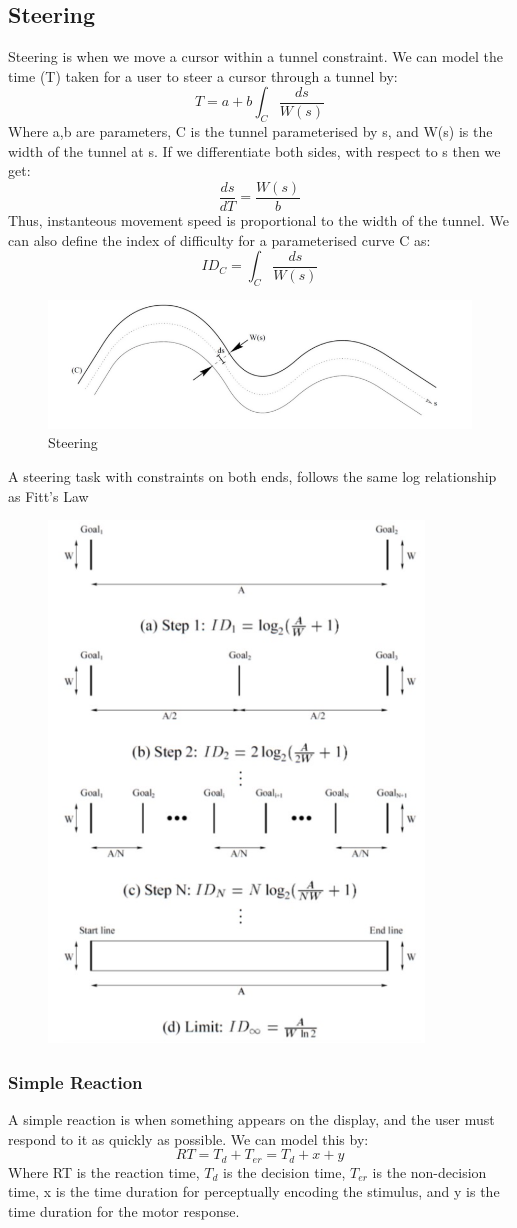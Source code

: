 \documentclass{article}
\begin{document}
\subsection{Steering}
Steering is when we move a cursor within a tunnel constraint. We can model the time (T) taken for a user to steer a cursor through a tunnel by:
\[
T = a + b \int_C \frac{ds}{W(s)}
\]
Where a,b are parameters, C is the tunnel parameterised by s, and W(s) is the width of the tunnel at s. If we differentiate both sides, with respect to s then we get:
\[
\frac{ds}{dT} = \frac{W(s)}{b}
\]
Thus, instanteous movement speed is proportional to the width of the tunnel. We can also define the index of difficulty for a parameterised curve C as:
\[
ID_C = \int_C \frac{ds}{W(s)}
\]
\begin{figure}[H]
    \centering
    \includegraphics[width=0.5\linewidth]{Pictures/Screenshot 2023-02-22 at 18.21.16.png}
    \caption{Steering}
\end{figure}
A steering task with constraints on both ends, follows the same log relationship as Fitt's Law
\begin{figure}[H]
    \centering
    \includegraphics[width=0.3\linewidth]{Pictures/Screenshot 2023-02-22 at 18.23.08.png}
\end{figure}
\subsubsection*{Simple Reaction}
A simple reaction is when something appears on the display, and the user must respond to it as quickly as possible. We can model this by:
\[
RT = T_d + T_{er} = T_d + x +y
\]
Where RT is the reaction time, $T_d$ is the decision time, $T_{er}$ is the non-decision time, x is the time duration for perceptually encoding the stimulus, and y is the time duration for the motor response.
\end{document}
